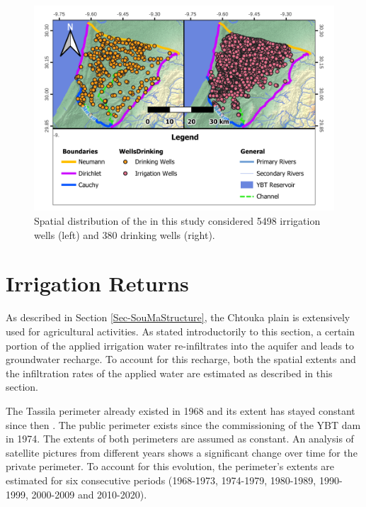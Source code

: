 \begin{figure}[h]
    \centering
    \includegraphics{./img/Map_IrrDri.pdf}
    \caption{Spatial distribution of the in this study considered 5498 irrigation wells (left) and 380 drinking wells (right).}
    \label{Map-PumpWells}
\end{figure}


\section{Irrigation Returns}
\label{Sec-IrrRech}

As described in Section \ref{Sec-SouMaStructure}, the Chtouka plain is extensively used for agricultural activities. 
As stated introductorily to this section, a certain portion of the applied irrigation water re-infiltrates into the aquifer and leads to groundwater recharge. 
To account for this recharge, both the spatial extents and the infiltration rates of the applied water are estimated as described in this section.


The Tassila perimeter already existed in 1968 and its extent has stayed constant since then \textcite{Bernet.1977}.
The public perimeter exists since the commissioning of the YBT dam in 1974. 
The extents of both perimeters are assumed as constant. 
An analysis of satellite pictures from different years shows a significant change over time for the private perimeter. 
To account for this evolution, the perimeter's extents are estimated for six consecutive periods (1968-1973, 1974-1979, 1980-1989, 1990-1999, 2000-2009 and 2010-2020). 

